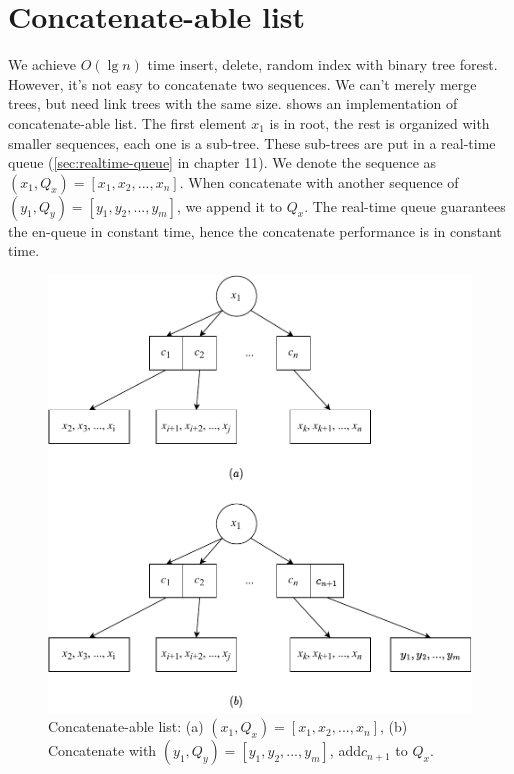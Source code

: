\documentclass[b5paper]{article}
\begin{document}
\section{Concatenate-able list}

We achieve $O(\lg n)$ time insert, delete, random index with binary tree forest. However, it's not easy to concatenate two sequences. We can't merely merge trees, but need link trees with the same size.  shows an implementation of concatenate-able list. The first element $x_1$ is in root, the rest is organized with smaller sequences, each one is a sub-tree. These sub-trees are put in a real-time queue (\cref{sec:realtime-queue} in chapter 11). We denote the sequence as $(x_1, Q_x) = [x_1, x_2, ..., x_n]$. When concatenate with another sequence of $(y_1, Q_y) = [y_1, y_2, ..., y_m]$, we append it to $Q_x$. The real-time queue guarantees the en-queue in constant time, hence the concatenate performance is in constant time.

\begin{figure}[htbp]
  \centering
  \includegraphics[scale=0.6]{img/clist}
  \caption{Concatenate-able list: (a) $(x_1, Q_x) = [x_1, x_2, ..., x_n]$, (b) Concatenate with $(y_1, Q_y) = [y_1, y_2, ..., y_m]$, add$c_{n+1}$ to $Q_x$.}
  \label{fig:clist}
\end{figure}
\end{document}
